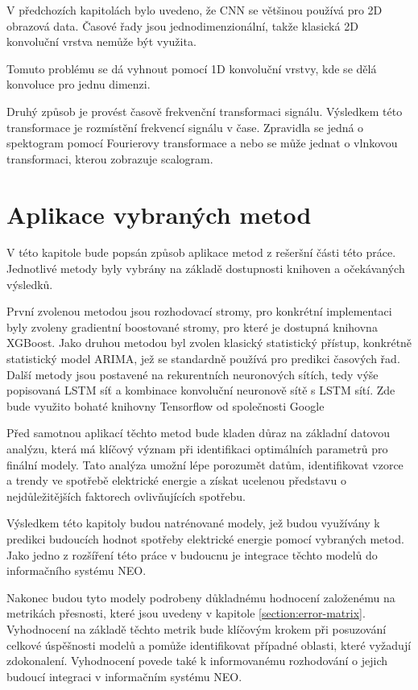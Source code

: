 \documentclass[FM,BP,fonts]{tulthesis}
\begin{document}
V předchozích kapitolách bylo uvedeno, že CNN se většinou používá pro 2D obrazová data. Časové řady jsou  jednodimenzionální, takže klasická 2D konvoluční vrstva nemůže být využita.

Tomuto problému se dá vyhnout pomocí 1D konvoluční vrstvy, kde se dělá konvoluce pro jednu dimenzi. \cite{article}

Druhý způsob je provést časově frekvenční transformaci signálu. \cite{10201713} Výsledkem této transformace je rozmístění frekvencí signálu v čase. Zpravidla se jedná o spektogram pomocí Fourierovy transformace a nebo se může jednat o vlnkovou transformaci, kterou zobrazuje scalogram.


\chapter{Aplikace vybraných metod}
V této kapitole bude popsán způsob aplikace metod z rešeršní části této práce. Jednotlivé metody byly vybrány na základě dostupnosti knihoven a očekávaných výsledků.

První zvolenou metodou jsou rozhodovací stromy, pro konkrétní implementaci byly zvoleny gradientní boostované stromy, pro které je dostupná knihovna XGBoost. Jako druhou metodou byl zvolen klasický statistický přístup, konkrétně statistický model ARIMA, jež se standardně používá pro predikci časových řad. Další metody jsou postavené na rekurentních neuronových sítích, tedy výše popisovaná LSTM síť a kombinace konvoluční neuronově sítě s LSTM sítí. Zde bude využito bohaté knihovny Tensorflow od společnosti Google

Před samotnou aplikací těchto metod bude kladen důraz na základní datovou analýzu, která má klíčový význam při identifikaci optimálních parametrů pro finální modely. Tato analýza umožní lépe porozumět datům, identifikovat vzorce a trendy ve spotřebě elektrické energie a získat ucelenou představu o nejdůležitějších faktorech ovlivňujících spotřebu.

Výsledkem této kapitoly budou natrénované modely, jež budou využívány k predikci budoucích hodnot spotřeby elektrické energie pomocí vybraných metod. Jako jedno z rozšíření této práce v budoucnu je integrace těchto modelů do informačního systému NEO.  

Nakonec budou tyto modely podrobeny důkladnému hodnocení založenému na metrikách přesnosti, které jsou uvedeny v kapitole \ref{section:error-matrix}. Vyhodnocení na základě těchto metrik bude klíčovým krokem při posuzování celkové úspěšnosti modelů a pomůže identifikovat případné oblasti, které vyžadují zdokonalení. Vyhodnocení povede také k informovanému rozhodování o jejich budoucí integraci v informačním systému NEO.
\end{document}
